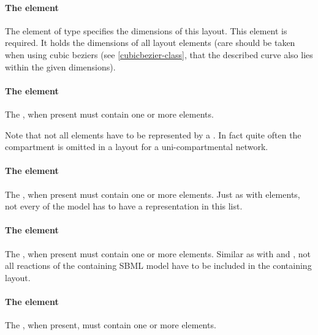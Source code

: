 \paragraph{The  element}
The  element of type \Dimensions specifies the 
dimensions of this layout. This element is required. It holds the 
dimensions of all layout elements (care should be taken when using cubic 
beziers (see \ref{cubicbezier-class}, that the described curve also lies 
within the given dimensions). 


\paragraph{The  element}
\label{listofcompartmentglyphs-class}
The , when present must contain one or 
more \CompartmentGlyph elements. 

Note that not all \Compartment elements have to be represented by a \CompartmentGlyph. In fact quite often the 
compartment is omitted in a layout for a uni-compartmental network. 


\paragraph{The  element}
\label{listofspeciesglyphs-class}
The , when present must contain one or more 
\SpeciesGlyph elements. Just as with \CompartmentGlyph elements, not every \Species of the model has to have a representation in this list.


\paragraph{The  element}
\label{listofreactionglyphs-class}
The , when present must contain one or more 
\ReactionGlyph elements. Similar as with \ListOfCompartmentGlyphs and 
\ListOfSpeciesGlyphs, not all reactions of the containing SBML model 
have to be included in the containing layout. 


\paragraph{The  element}
\label{listoftextglyphs-class}
The , when present, must contain one or more 
\TextGlyph elements. 


